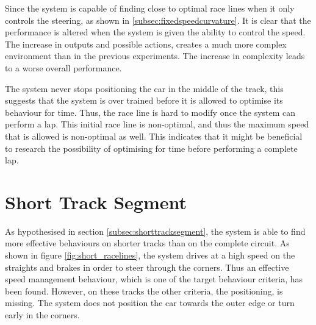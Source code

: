Since the system is capable of finding close to optimal race lines when it only controls the steering, as shown in \ref{subsec:fixedspeedcurvature}. It is clear that the performance is altered when the system is given the ability to control the speed. The increase in outputs and possible actions, creates a much more complex environment than in the previous experiments. The increase in complexity leads to a worse overall performance. 

The system never stops positioning the car in the middle of the track, this suggests that the system is over trained before it is allowed to optimise its behaviour for time. Thus, the race line is hard to modify once the system can perform a lap. This initial race line is non-optimal, and thus the maximum speed that is allowed is non-optimal as well. This indicates that it might be beneficial to research the possibility of optimising for time before performing a complete lap.



\section{Short Track Segment}
\label{result:short}
As hypothesised in section \ref{subsec:shorttracksegment}, the system is able to find more effective behaviours on shorter tracks than on the complete circuit. As shown in figure \ref{fig:short_racelines}, the system drives at a high speed on the straights and brakes in order to steer through the corners. Thus an effective speed management behaviour, which is one of the target behaviour criteria, has been found. However, on these tracks the other criteria, the positioning, is missing. The system does not position the car towards the outer edge or turn early in the corners. 

